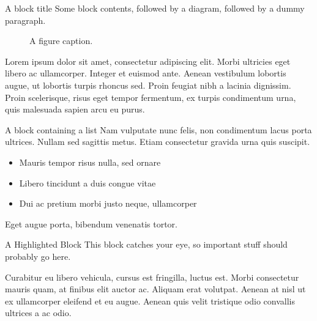\documentclass[final]{beamer}
\begin{document}
\begin{frame}[label={sec:org5a641b0}]{}
\begin{columns}
\begin{column}{0.3\columnwidth}
\begin{block}{A block title}
Some block contents, followed by a diagram, followed by a dummy paragraph.

\begin{figure}
  \centering
  \caption{A figure caption.}
\end{figure}

Lorem ipsum dolor sit amet, consectetur adipiscing elit. Morbi ultricies eget
libero ac ullamcorper. Integer et euismod ante. Aenean vestibulum lobortis
augue, ut lobortis turpis rhoncus sed. Proin feugiat nibh a lacinia
dignissim. Proin scelerisque, risus eget tempor fermentum, ex turpis condimentum
urna, quis malesuada sapien arcu eu purus.
\end{block}

\begin{block}{A block containing a list}
Nam vulputate nunc felis, non condimentum lacus porta ultrices. Nullam sed
sagittis metus. Etiam consectetur gravida urna quis suscipit.

\begin{itemize}
\item \alert{Mauris tempor} risus nulla, sed ornare
\item \alert{Libero tincidunt} a duis congue vitae
\item \alert{Dui ac pretium} morbi justo neque, ullamcorper
\end{itemize}

Eget augue porta, bibendum venenatis tortor.
\end{block}

\begin{alertblock}{A Highlighted Block}
This block catches your eye, so \alert{important stuff} should probably go
here.

Curabitur eu libero vehicula, cursus est fringilla, luctus est. Morbi
consectetur mauris quam, at finibus elit auctor ac. Aliquam erat volutpat.
Aenean at nisl ut ex ullamcorper eleifend et eu augue. Aenean quis velit
tristique odio convallis ultrices a ac odio.


\end{alertblock}
\end{column}
\end{columns}
\end{frame}
\end{document}
